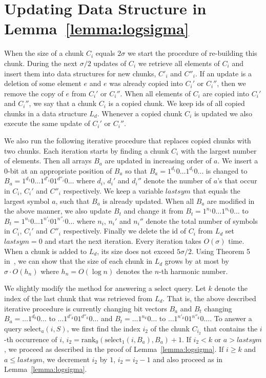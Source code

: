 \documentclass[11pt]{article}\usepackage{fullpage}
\def\idrm#1{\ensuremath{\mathrm{#1}}}
\newcommand{\ra}{\idrm{rank}}
\newcommand{\sel}{\idrm{select}}
\begin{document}
\section{Updating Data Structure in Lemma~\ref{lemma:logsigma}}
\label{sec:logsigmaupd}
When the size of a chunk $C_i$ equals $2\sigma$ we start the procedure of re-building this chunk. During the next $\sigma/2$ updates of $C_i$ we retrieve all elements of $C_i$ and insert them  into data structures for new chunks, $C'_i$ and $C''_i$. If an update is a deletion of some element $e$ and $e$ was already copied into $C_i'$ or $C_i''$, then we remove the copy of $e$
from $C_i'$ or $C_i''$. When all elements of $C_i$ are copied into $C_i'$ and $C_i''$, we say that a chunk $C_i$ is a copied
chunk. We keep ids of all copied chunks in a data structure $L_d$. Whenever a copied chunk $C_i$ is updated we also execute  the same update of $C_i'$ or $C_i''$.

We also run the following iterative procedure that replaces copied chunks with two chunks. Each iteration starts by finding a chunk $C_i$ with the largest number of elements. Then all arrays $B_a$ are updated in increasing order of $a$. We insert a $0$-bit at an appropriate position of $B_a$ so that $B_a=1^{d_1}0\ldots1^{d_i}0\ldots$ is changed to $B_a=1^{d_1}0\ldots1^{d'_i}01^{d''_i}0\ldots$ where $d_i$, $d_i'$ and $d_i''$ denote the number of $a$'s that occur in $C_i$, $C_i'$ and $C''_i$ respectively. We keep a variable $lastsym$ that equals the largest symbol $a$, such that $B_a$ is already updated. When all $B_a$ are modified in the above manner, we also update $B_t$ and change it from $B_t=1^{n_1}0\ldots1^{n_i}0\ldots$ to $B_t=1^{n_1}0\ldots1^{n'_i}01^{n''_i}0\ldots$ where $n_i$, $n_i'$ and $n_i''$ denote the total number of symbols in $C_i$, $C_i'$ and $C''_i$ respectively. Finally we delete the id of $C_i$ from 
$L_d$ set $lastsym=0$ and start the next iteration.  Every iteration takes $O(\sigma)$ time.  When a chunk is added to $L_d$, its size does not exceed $5\sigma/2$. Using Theorem 5 in~\cite{DietzS87}, we can show that the size of each chunk in $L_d$ grows by at most by $\sigma\cdot O(h_n)$ where $h_n=O(\log n)$ denotes the $n$-th harmonic number. 

We slightly modify the method for answering a $\sel$ query. 
Let $k$ denote the index of the last chunk that was retrieved from $L_d$. That is, the above described iterative procedure is currently changing bit vectors $B_a$ and $B_t$ changing 
$B_a=\ldots1^{d_k}0\ldots$ to $\ldots1^{d'_k}01^{d''_k}0\ldots$ and 
$B_t=\ldots1^{n_k}0\ldots$ to $\ldots1^{n'_k}01^{n''_k}0\ldots$.
To answer a query $\sel_a(i,S)$, we first find the index $i_2$
of the chunk $C_{i_2}$ that contains the $i$-th occurrence of $i$,
$i_2=\ra_0(\sel_1(i,B_a),B_a)+1$. 
If $i_2<k$ or $a>lastsym$, we proceed as described in the proof of Lemma~\ref{lemma:logsigma}.  
If $i\ge k$ and $a\le lastsym$, we decrement $i_2$ by $1$, $i_2=i_2-1$ and also proceed as in Lemma~\ref{lemma:logsigma}. 
\end{document}

